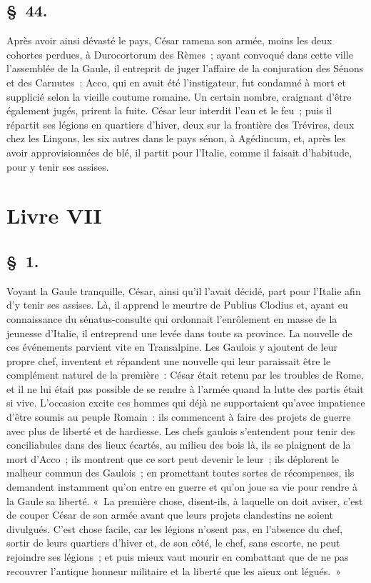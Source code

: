 \documentclass[french,twoside]{book} %
\begin{document}
\subsection[{§ 44.}]{ \textsc{§ 44.} }
\noindent Après avoir ainsi dévasté le pays, César ramena son armée, moins les deux cohortes perdues, à Durocortorum des Rèmes ; ayant convoqué dans cette ville l’assemblée de la Gaule, il entreprit de juger l’affaire de la conjuration des Sénons et des Carnutes : Acco, qui en avait été l’instigateur, fut condamné à mort et supplicié selon la vieille coutume romaine. Un certain nombre, craignant d’être également jugés, prirent la fuite. César leur interdit l’eau et le feu ; puis il répartit ses légions en quartiers d’hiver, deux sur la frontière des Trévires, deux chez les Lingons, les six autres dans le pays sénon, à Agédincum, et, après les avoir approvisionnées de blé, il partit pour l’Italie, comme il faisait d’habitude, pour y tenir ses assises.
 \section[{Livre VII}]{Livre VII}\renewcommand{\leftmark}{Livre VII}

\subsection[{§ 1.}]{ \textsc{§ 1.} }
\noindent Voyant la Gaule tranquille, César, ainsi qu’il l’avait décidé, part pour l’Italie afin d’y tenir ses assises. Là, il apprend le meurtre de Publius Clodius et, ayant eu connaissance du sénatus-consulte qui ordonnait l’enrôlement en masse de la jeunesse d’Italie, il entreprend une levée dans toute sa province. La nouvelle de ces événements parvient vite en Transalpine. Les Gaulois y ajoutent de leur propre chef, inventent et répandent une nouvelle qui leur paraissait être le complément naturel de la première : César était retenu par les troubles de Rome, et il ne lui était pas possible de se rendre à l’armée quand la lutte des partis était si vive. L'occasion excite ces hommes qui déjà ne supportaient qu’avec impatience d’être soumis au peuple Romain : ils commencent à faire des projets de guerre avec plus de liberté et de hardiesse. Les chefs gaulois s’entendent pour tenir des conciliabules dans des lieux écartés, au milieu des bois là, ils se plaignent de la mort d’Acco ; ils montrent que ce sort peut devenir le leur ; ils déplorent le malheur commun des Gaulois ; en promettant toutes sortes de récompenses, ils demandent instamment qu’on entre en guerre et qu’on joue sa vie pour rendre à la Gaule sa liberté. « La première chose, disent-ils, à laquelle on doit aviser, c’est de couper César de son armée avant que leurs projets clandestins ne soient divulgués. C'est chose facile, car les légions n’osent pas, en l’absence du chef, sortir de leurs quartiers d’hiver et, de son côté, le chef, sans escorte, ne peut rejoindre ses légions ; et puis mieux vaut mourir en combattant que de ne pas recouvrer l’antique honneur militaire et la liberté que les aïeux ont légués. »
\end{document}
